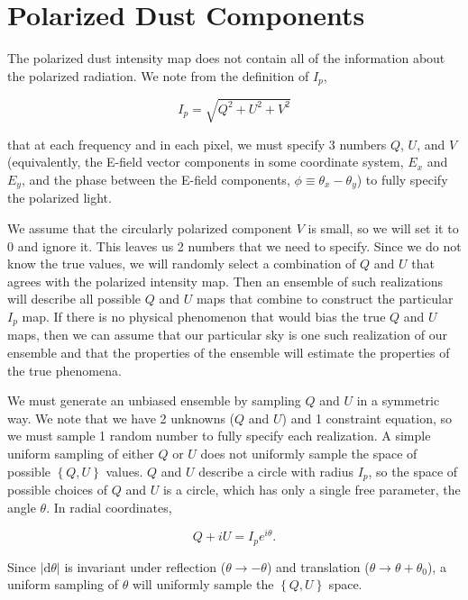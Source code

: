 \documentclass[twoside,10pt]{article}
\newcommand{\abs}[1]{\lvert#1\rvert}
\newcommand{\pc}[1]{\left\{ #1 \right\} }
\newcommand{\dd}[0]{\mathrm{d}}
\begin{document}
\section{Polarized Dust Components}
\label{sec:polarized_dust_components}

The polarized dust intensity map does not contain all of the information
about the polarized radiation. We note from the definition of $I_p$,

\begin{equation}
    I_p = \sqrt{Q^2 + U^2 + V^2}
\end{equation}

that at each frequency and in each pixel, we must specify 3 numbers $Q$, $U$,
and $V$ (equivalently, the E-field vector components in some coordinate
system, $E_x$ and $E_y$, and the phase between the E-field components,
$\phi \equiv \theta_x - \theta_y$)\cite{kamionkowski_statistics_1997}
to fully specify the polarized light.

We assume that the circularly polarized component $V$ is
small\cite{mainini_improved_2013}, so we will set it to 0 and ignore it. This
leaves us 2 numbers that we need to specify. Since we do not know the true
values, we will randomly select a combination of $Q$ and $U$ that agrees with
the polarized intensity map. Then an ensemble of such realizations will
describe all possible $Q$ and $U$ maps that combine to construct the
particular $I_p$ map. If there is no physical phenomenon that would bias the
true $Q$ and $U$ maps, then we can assume that our particular sky is one such
realization of our ensemble and that the properties of the ensemble will
estimate the properties of the true phenomena.

We must generate an unbiased ensemble by sampling $Q$ and $U$ in a symmetric
way. We note that we have 2 unknowns ($Q$ and $U$) and 1 constraint equation,
so we must sample 1 random number to fully specify each realization. A simple
uniform sampling of either $Q$ or $U$ does not uniformly sample the space of
possible $\pc{Q, U}$ values. $Q$ and $U$ describe a circle with radius $I_p$,
so the space of possible choices of $Q$ and $U$ is a circle, which has only a
single free parameter, the angle $\theta$. In radial coordinates,

\begin{equation}
    Q + iU = I_p e^{i\theta}.
\end{equation}

Since $\abs{\dd\theta}$ is invariant under reflection
($\theta \to -\theta$) and translation ($\theta \to \theta + \theta_0$), a
uniform sampling of $\theta$ will uniformly sample the $\pc{Q, U}$ space.
\end{document}
